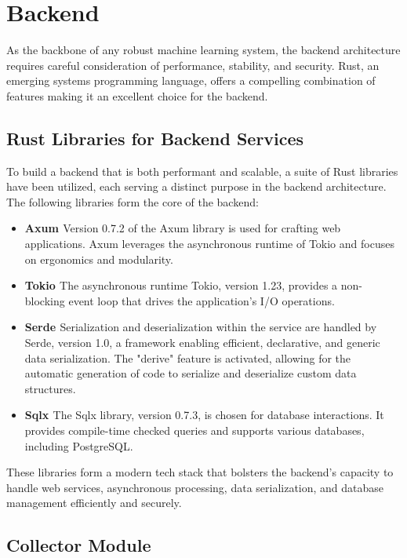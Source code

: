 \section{Backend}
As the backbone of any robust machine learning system, the backend architecture requires careful consideration of performance, stability, and security. Rust, an emerging systems programming language, offers a compelling combination of features making it an excellent choice for the backend.

\subsection{Rust Libraries for Backend Services}

To build a backend that is both performant and scalable, a suite of Rust libraries have been utilized, each serving a distinct purpose in the backend architecture. The following libraries form the core of the backend:

\begin{itemize}
    \item \textbf{Axum \cite{AxumDocumentation}} Version 0.7.2 of the Axum library is used for crafting web applications. Axum leverages the asynchronous runtime of Tokio and focuses on ergonomics and modularity. 
    \item \textbf{Tokio \cite{TokioDocumentation}} The asynchronous runtime Tokio, version 1.23, provides a non-blocking event loop that drives the application's I/O operations.
    \item \textbf{Serde \cite{SerdeDocumentation}} Serialization and deserialization within the service are handled by Serde, version 1.0, a framework enabling efficient, declarative, and generic data serialization. The "derive" feature is activated, allowing for the automatic generation of code to serialize and deserialize custom data structures.
    \item \textbf{Sqlx \cite{SQLxDocumentation}} The Sqlx library, version 0.7.3, is chosen for database interactions. It provides compile-time checked queries and supports various databases, including PostgreSQL.
\end{itemize}

These libraries form a modern tech stack that bolsters the backend's capacity to handle web services, asynchronous processing, data serialization, and database management efficiently and securely.

\subsection{Collector Module}
\label{section:collector}

